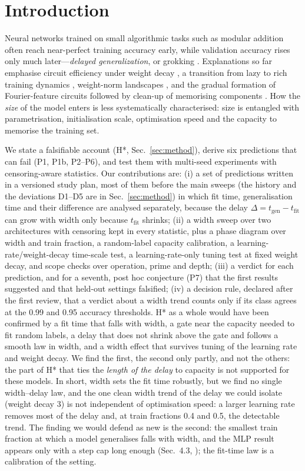 \documentclass{article}
\begin{document}
\section{Introduction}
Neural networks trained on small algorithmic tasks such as modular addition often reach near-perfect training accuracy early, while validation accuracy rises only much later---\emph{delayed generalization}, or grokking \citep{power2022grokking}. Explanations so far emphasise circuit efficiency under weight decay \citep{varma2023explaining}, a transition from lazy to rich training dynamics \citep{kumar2024grokking}, weight-norm landscapes \citep{liu2023omnigrok}, and the gradual formation of Fourier-feature circuits followed by clean-up of memorising components \citep{nanda2023progress}. How the \emph{size} of the model enters is less systematically characterised: size is entangled with parametrisation, initialisation scale, optimisation speed and the capacity to memorise the training set.

We state a falsifiable account (H*, Sec.~\ref{sec:method}), derive six predictions that can fail (P1, P1b, P2--P6), and test them with multi-seed experiments with censoring-aware statistics. Our contributions are: (i) a set of predictions written in a versioned study plan, most of them before the main sweeps (the history and the deviations D1--D5 are in Sec.~\ref{sec:method}) in which fit time, generalisation time and their difference are analysed separately, because the delay $\Delta=t_{\mathrm{gen}}-t_{\mathrm{fit}}$ can grow with width only because $t_{\mathrm{fit}}$ shrinks; (ii) a width sweep over two architectures with censoring kept in every statistic, plus a phase diagram over width and train fraction, a random-label capacity calibration, a learning-rate/weight-decay time-scale test, a learning-rate-only tuning test at fixed weight decay, and scope checks over operation, prime and depth; (iii) a verdict for each prediction, and for a seventh, post hoc conjecture (P7) that the first results suggested and that held-out settings falsified; (iv) a decision rule, declared after the first review, that a verdict about a width trend counts only if its class agrees at the 0.99 and 0.95 accuracy thresholds. H* as a whole would have been confirmed by a fit time that falls with width, a gate near the capacity needed to fit random labels, a delay that does not shrink above the gate and follows a smooth law in width, and a width effect that survives tuning of the learning rate and weight decay. We find the first, the second only partly, and not the others: the part of H* that ties the \emph{length of the delay} to capacity is not supported for these models. In short, width sets the fit time robustly, but we find no single width--delay law, and the one clean width trend of the delay we could isolate (weight decay 3) is not independent of optimisation speed: a larger learning rate removes most of the delay and, at train fractions 0.4 and 0.5, the detectable trend. The finding we would defend as new is the second: the smallest train fraction at which a model generalises falls with width, and the MLP result appears only with a step cap long enough (Sec.~4.3, ); the fit-time law is a calibration of the setting.
\end{document}

